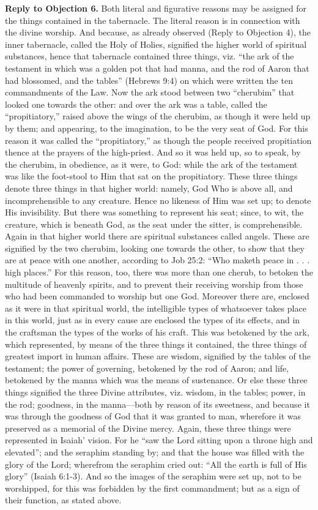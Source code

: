 \textbf{Reply to Objection 6.} Both literal and figurative reasons may be assigned for the things contained in the tabernacle. The literal reason is in connection with the divine worship. And because, as already observed (Reply to Objection 4), the inner tabernacle, called the Holy of Holies, signified the higher world of spiritual substances, hence that tabernacle contained three things, viz. ``the ark of the testament in which was a golden pot that had manna, and the rod of Aaron that had blossomed, and the tables'' (Hebrews 9:4) on which were written the ten commandments of the Law. Now the ark stood between two ``cherubim'' that looked one towards the other: and over the ark was a table, called the ``propitiatory,'' raised above the wings of the cherubim, as though it were held up by them; and appearing, to the imagination, to be the very seat of God. For this reason it was called the ``propitiatory,'' as though the people received propitiation thence at the prayers of the high-priest. And so it was held up, so to speak, by the cherubim, in obedience, as it were, to God: while the ark of the testament was like the foot-stool to Him that sat on the propitiatory. These three things denote three things in that higher world: namely, God Who is above all, and incomprehensible to any creature. Hence no likeness of Him was set up; to denote His invisibility. But there was something to represent his seat; since, to wit, the creature, which is beneath God, as the seat under the sitter, is comprehensible. Again in that higher world there are spiritual substances called angels. These are signified by the two cherubim, looking one towards the other, to show that they are at peace with one another, according to Job 25:2: ``Who maketh peace in . . . high places.'' For this reason, too, there was more than one cherub, to betoken the multitude of heavenly spirits, and to prevent their receiving worship from those who had been commanded to worship but one God. Moreover there are, enclosed as it were in that spiritual world, the intelligible types of whatsoever takes place in this world, just as in every cause are enclosed the types of its effects, and in the craftsman the types of the works of his craft. This was betokened by the ark, which represented, by means of the three things it contained, the three things of greatest import in human affairs. These are wisdom, signified by the tables of the testament; the power of governing, betokened by the rod of Aaron; and life, betokened by the manna which was the means of sustenance. Or else these three things signified the three Divine attributes, viz. wisdom, in the tables; power, in the rod; goodness, in the manna—both by reason of its sweetness, and because it was through the goodness of God that it was granted to man, wherefore it was preserved as a memorial of the Divine mercy. Again, these three things were represented in Isaiah' vision. For he ``saw the Lord sitting upon a throne high and elevated''; and the seraphim standing by; and that the house was filled with the glory of the Lord; wherefrom the seraphim cried out: ``All the earth is full of His glory'' (Isaiah 6:1-3). And so the images of the seraphim were set up, not to be worshipped, for this was forbidden by the first commandment; but as a sign of their function, as stated above.

